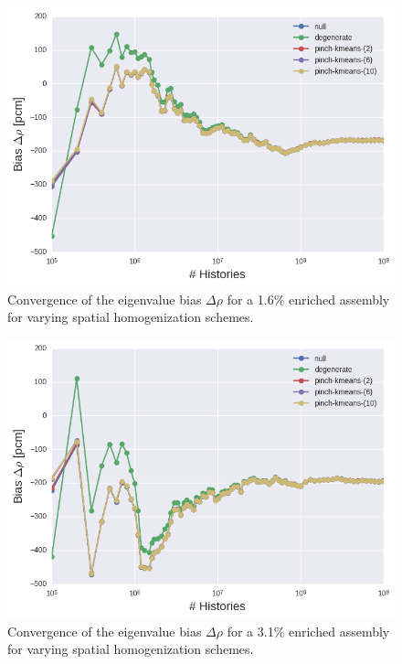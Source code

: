 \clearpage

\begin{figure}[h!]
\centering
\includegraphics[width=0.85\linewidth]{figures/results/assm-16/no-transform/keff-bias}
\vspace{2mm}
\caption[Eigenvalue bias covergence for a 1.6\% enriched assembly]{Convergence of the eigenvalue bias $\Delta\rho$ for a 1.6\% enriched assembly for varying spatial homogenization schemes.}
\label{fig:chap11-assm-1.6-eigenvalue-converge}
\end{figure}

\begin{figure}[h!]
\centering
\includegraphics[width=0.85\linewidth]{figures/results/assm-31/pca-transform/keff-bias}
\vspace{2mm}
\caption[Eigenvalue bias covergence for a 3.1\% enriched assembly]{Convergence of the eigenvalue bias $\Delta\rho$ for a 3.1\% enriched assembly for varying spatial homogenization schemes.}
\label{fig:chap11-assm-3.1-eigenvalue-converge}
\end{figure}

